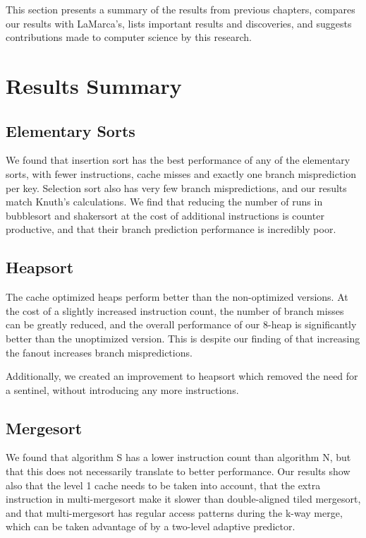 \label{conclusions}
This section presents a summary of the results from previous chapters, compares
our results with LaMarca's, lists important results and discoveries, and
suggests contributions made to computer science by this research.

\section{Results Summary}

\subsection{Elementary Sorts}

We found that insertion sort has the best performance of any of the elementary
sorts, with fewer instructions, cache misses and exactly one branch
misprediction per key. Selection sort also has very few branch mispredictions,
and our results match Knuth's calculations. We find that reducing the number of
runs in bubblesort and shakersort at the cost of additional instructions is
counter productive, and that their branch prediction performance is incredibly
poor.

\subsection{Heapsort}

The cache optimized heaps perform better than the non-optimized versions. At the
cost of a slightly increased instruction count, the number of branch misses can
be greatly reduced, and the overall performance of our 8-heap is significantly
better than the unoptimized version. This is despite our finding of that
increasing the fanout increases branch mispredictions.

Additionally, we created an improvement to heapsort which removed the need for a
sentinel, without introducing any more instructions.

\subsection{Mergesort}

We found that algorithm S has a lower instruction count than algorithm N, but
that this does not necessarily translate to better performance. Our results show
also that the level 1 cache needs to be taken into account, that the extra
instruction in multi-mergesort make it slower than double-aligned tiled
mergesort, and that multi-mergesort has regular access patterns during the k-way
merge, which can be taken advantage of by a two-level adaptive predictor.



